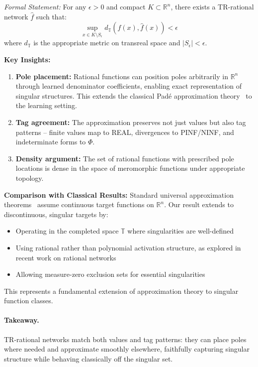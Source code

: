 \documentclass[twoside,11pt]{article}
\newcommand{\TR}{\mathbb{T}}
\newcommand{\trReal}{\textsc{REAL}}
\newcommand{\trPINF}{\textsc{PINF}}
\newcommand{\trNINF}{\textsc{NINF}}
\newcommand{\trPHI}{\textsc{$\Phi$}}
\newcommand{\TAGREAL}{\trReal}
\newcommand{\TAGPINF}{\trPINF}
\newcommand{\TAGNINF}{\trNINF}
\newcommand{\TAGPHI}{\trPHI}
\begin{document}
\emph{Formal Statement:} For any $\epsilon > 0$ and compact $K \subset \mathbb{R}^n$, there exists a TR-rational network $\hat{f}$ such that:
$$\sup_{x \in K \setminus S_\epsilon} d_{\TR}(f(x), \hat{f}(x)) < \epsilon$$
where $d_{\TR}$ is the appropriate metric on transreal space and $|S_\epsilon| < \epsilon$.

\textbf{Key Insights:}
\begin{enumerate}
\item \textbf{Pole placement:} Rational functions can position poles arbitrarily in $\mathbb{R}^n$ through learned denominator coefficients, enabling exact representation of singular structures. This extends the classical Padé approximation theory~\citep{baker1996pade} to the learning setting.
\item \textbf{Tag agreement:} The approximation preserves not just values but also tag patterns -- finite values map to \TAGREAL, divergences to \TAGPINF/\TAGNINF, and indeterminate forms to \TAGPHI.
\item \textbf{Density argument:} The set of rational functions with prescribed pole locations is dense in the space of meromorphic functions under appropriate topology.
\end{enumerate}

\textbf{Comparison with Classical Results:}
Standard universal approximation theorems~\citep{cybenko1989approximation,hornik1989multilayer,pinkus1999approximation} assume continuous target functions on $\mathbb{R}^n$. Our result extends to discontinuous, singular targets by:
\begin{itemize}
\item Operating in the completed space $\TR$ where singularities are well-defined
\item Using rational rather than polynomial activation structure, as explored in recent work on rational networks~\citep{boulle2020rational,telgarsky2017neural}
\item Allowing measure-zero exclusion sets for essential singularities
\end{itemize}

This represents a fundamental extension of approximation theory to singular function classes.
\paragraph{Takeaway.} TR-rational networks match both values and tag patterns: they can place poles where needed and approximate smoothly elsewhere, faithfully capturing singular structure while behaving classically off the singular set.
\end{document}

